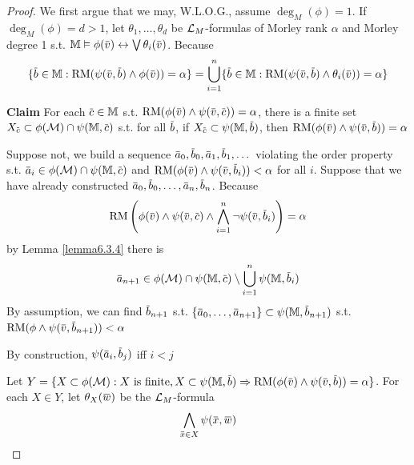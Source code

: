 \documentclass[11pt]{article}
\begin{document}
\begin{proof}
We first argue that we may, W.L.O.G., assume \(\deg_M(\phi)=1\). If \(\deg_M(\phi)=d>1\),
let \(\theta_1,\dots,\theta_d\) be \(\mathcal{L}_M\)-formulas of Morley rank \(\alpha\) and Morley degree 1
s.t. \(\M\vDash\phi(\barv)\leftrightarrow\bigvee\theta_i(\barv)\). Because
\begin{equation*}
\{\barb\in\M:\RM(\psi(\barv,\barb)\wedge\phi(\barv))=\alpha\}=\bigcup_{i=1}^n\{\barb\in\M:\RM(\psi(\barv,\barb)\wedge\theta_i(\barv))=\alpha\}
\end{equation*}

\textbf{Claim} For each \(\barc\in\M\) s.t. \(\RM(\phi(\barv)\wedge\psi(\barv,\barc))=\alpha\), there is a finite
set \(X_{\barc}\subset\phi(\calm)\cap\psi(\M,\barc)\) s.t. for all \(\barb\), if \(X_{\barc}\subset\psi(\M,\barb)\),
then \(\RM(\phi(\barv)\wedge\psi(\barv,\barb))=\alpha\)

Suppose not, we build a sequence \(\bara_0,\barb_0,\bara_1,\barb_1,\dots\) violating the order
property s.t. \(\bara_i\in\phi(\calm)\cap\psi(\M,\barc)\) and \(\RM(\phi(\barv)\wedge\psi(\barv,\barb_i))<\alpha\) for all \(i\).
Suppose that we have already constructed \(\bara_0,\barb_0,\dots,\bara_n,\barb_n\). Because
\begin{equation*}
\RM\left( \phi(\barv)\wedge\psi(\barv,\barc)\wedge\bigwedge_{i=1}^n\neg\psi(\barv,\barb_i) \right)=\alpha
\end{equation*}
by Lemma \ref{lemma6.3.4} there is
\begin{equation*}
\bara_{n+1}\in\phi(\calm)\cap\psi(\M,\barc)\setminus\bigcup_{i=1}^n\psi(\M,\barb_i)
\end{equation*}
By assumption, we can find \(\barb_{n+1}\) s.t. \(\{\bara_0,\dots,\bara_{n+1}\}\subset\psi(\M,\barb_{n+1})\)
s.t. \(\RM(\phi\wedge\psi(\barv,\barb_{n+1}))<\alpha\)

By construction, \(\psi(\bara_i,\barb_j)\) iff \(i<j\)

Let \(Y=\{X\subset\phi(\calm):X\text{ is finite},X\subset\psi(\M,\barb)\Rightarrow\RM(\phi(\barv)\wedge\psi(\barv,\barb))=\alpha\}\).
For each \(X\in Y\), let \(\theta_X(\barw)\) be the \(\mathcal{L}_M\)-formula
\begin{equation*}
\bigwedge_{\barx\in X}\psi(\barx,\barw)
\end{equation*}


\end{proof}
\end{document}
